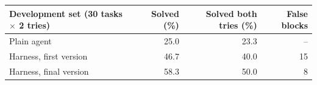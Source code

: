 \begin{tabular}{lrrr}
\toprule
Development set (30 tasks $\times$ 2 tries) & Solved (\%) & Solved both tries (\%) & False blocks \\
\midrule
Plain agent & 25.0 & 23.3 & -- \\
Harness, first version & 46.7 & 40.0 & 15 \\
Harness, final version & 58.3 & 50.0 & 8 \\
\bottomrule
\end{tabular}
